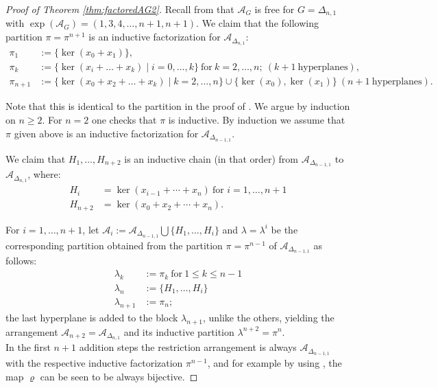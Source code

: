 \documentclass[12pt]{amsart}
\newcommand\CA{{\mathscr A}}
\numberwithin{equation}{section}
\theoremstyle{plain}
\theoremstyle{definition}
\begin{document}
\begin{proof}[Proof of Theorem \ref{thm:factoredAG2}]
	Recall from \cite[Thm.~5.4]{cuntzkuehne:subgraphs} that $\CA_G$ is free  for $G =\Delta_{n,1}$  with
	$\exp(\CA_G) = (1,3,4, \ldots ,n+1, n+1)$.
	We claim that the following partition $\pi = \pi^{n+1}$ is an inductive factorization for $\CA_{\Delta_{n,1}}$:
	\begin{align*}
		\label{eq:piDelta}
		\pi_1 & :=  \{\ker(x_0 + x_1)\},\\
		\pi_k & :=  \{ \ker(x_i +\ldots+ x_k) \mid i = 0,\ldots ,k \} \ \text{for}\ k=2, \ldots,n;\  (k+1\  \text{hyperplanes}),\\
		\pi_{n+1} & :=  \{\ker(x_0 + x_2 + \ldots + x_k) \mid k = 2,\ldots,n \} \cup \{ \ker(x_0), \ker(x_1) \}\ (n+1\ \text{hyperplanes}).
	\end{align*}

	Note that this is identical to the partition in the proof of \cite[Prop.~8.9]{cuntzkuehne:subgraphs}. We argue by induction on $n \ge 2$. For $ n = 2$ one checks that $\pi$ is inductive. By induction we assume that $\pi$ given above is an inductive factorization for $\CA_{\Delta_{n-1,1}}$.

		We claim that  $H_1,\ldots, H_{n+2}$  is an inductive chain (in that order) from $\CA_{\Delta_{n-1,1}}$ to $\CA_{\Delta_{n,1}}$, where:
	\begin{align*}
		H_i &= \ker(x_{i-1}+\cdots +x_n)\ \text{for } i = 1,\ldots, n+1 \\
		H_{n+2} &= \ker(x_0+x_2+\cdots+x_n).
	\end{align*}

	For $i=1,\ldots, n+1$, let $\CA_i := \CA_{\Delta_{n-1,1}} \bigcup \{H_1,\ldots, H_i \}$ and $\lambda=\lambda^{i}$ be the corresponding partition obtained from the partition $\pi = \pi^{n-1}$ of $\CA_{\Delta_{n-1,1}}$ as follows:
	\begin{align*}
		\lambda_k & :=  \pi_k \ \text{for}\ 1\leq k\leq n-1 \\
		\lambda_{n} &:= \{H_1,\ldots, H_i\}\\
		\lambda_{n+1} &:= \pi_{n};
	\end{align*}
	the last hyperplane is added to the block $\lambda_{n+1}$, unlike the others, yielding the arrangement $\CA_{n+2}=\CA_{\Delta_{n,1}}$ and its inductive partition $\lambda^{n+2}=\pi^n$. \\

	In the first $n+1$ addition steps the restriction arrangement is always $\CA_{\Delta_{n-1,1}}$ with the respective inductive factorization $\pi^{n-1}$, and for example by using \cite[Lem.~2.10]{cuntzkuehne:subgraphs}, the map $\varrho$ can be seen to be always bijective.


\end{proof}
\end{document}
